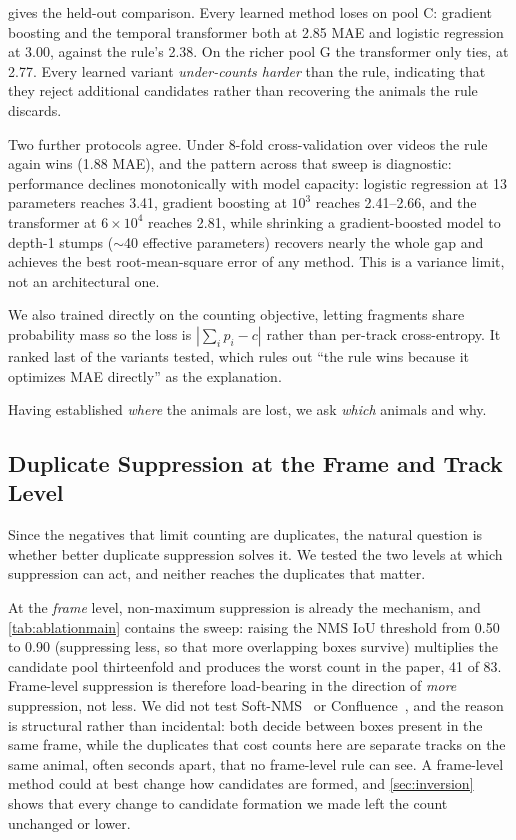  gives the held-out comparison. Every learned method loses on pool C: gradient boosting and the temporal transformer both at 2.85 MAE and logistic regression at 3.00, against the rule's 2.38. On the richer pool G the transformer only ties, at 2.77. Every learned variant \emph{under-counts harder} than the rule, indicating that they
reject additional candidates rather than recovering the animals the rule discards.

Two further protocols agree. Under 8-fold cross-validation over videos the rule again wins
(1.88 MAE), and the pattern across that sweep is diagnostic: performance declines monotonically with model capacity: logistic regression at 13 parameters reaches 3.41,
gradient boosting at $10^3$ reaches 2.41--2.66, and the transformer at $6\times10^4$ reaches
2.81, while shrinking a gradient-boosted model to depth-1 stumps ($\sim$40 effective
parameters) recovers nearly the whole gap and achieves the best root-mean-square error of any method. This is
a variance limit, not an architectural one.

We also trained directly on the counting objective, letting fragments share probability mass
so the loss is $|\sum_i p_i - c|$ rather than per-track cross-entropy. It ranked last of the variants tested, which rules out ``the rule wins because it optimizes MAE directly'' as the
explanation.

Having established \emph{where} the animals are lost, we ask \emph{which} animals and why.

\subsection{Duplicate Suppression at the Frame and Track Level}
\label{sec:nms}

Since the negatives that limit counting are duplicates, the natural question is whether
better duplicate suppression solves it. We tested the two levels at which suppression can
act, and neither reaches the duplicates that matter.

At the \emph{frame} level, non-maximum suppression is already the mechanism, and
\cref{tab:ablationmain} contains the sweep: raising the NMS IoU threshold from 0.50 to 0.90 (suppressing less, so that more overlapping boxes survive) multiplies the candidate pool
thirteenfold and produces the worst count in the paper, 41 of 83. Frame-level suppression is
therefore load-bearing in the direction of \emph{more} suppression, not less. We did not test
Soft-NMS~\cite{bodla2017softnms} or Confluence~\cite{shuai2021confluence}, and the reason is
structural rather than incidental: both decide between boxes present in the same frame, while
the duplicates that cost counts here are separate tracks on the same animal, often seconds
apart, that no frame-level rule can see. A frame-level method could at best change how
candidates are formed, and \cref{sec:inversion} shows that every change to candidate formation
we made left the count unchanged or lower.

